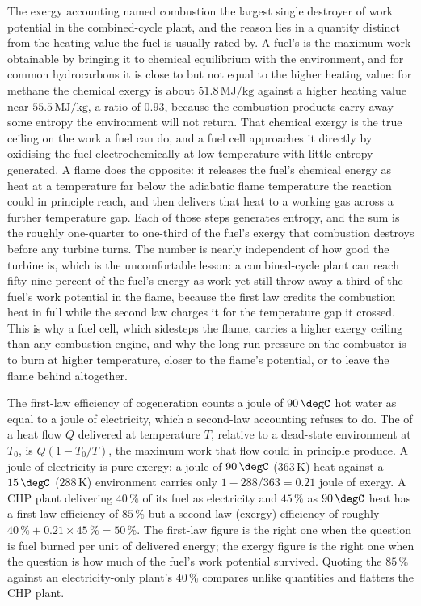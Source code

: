 \begin{mastery}
The exergy accounting named combustion the largest single destroyer of work
potential in the combined-cycle plant, and the reason lies in a quantity distinct
from the heating value the fuel is usually rated by. A fuel's  is the maximum work obtainable by bringing it to chemical equilibrium with
the environment, and for common hydrocarbons it is close to but not equal to the
higher heating value: for methane the chemical exergy is about
$51.8\,\text{MJ}/\text{kg}$ against a higher heating value near
$55.5\,\text{MJ}/\text{kg}$, a ratio of $0.93$, because the combustion products
carry away some entropy the environment will not return. That chemical exergy is
the true ceiling on the work a fuel can do, and a fuel cell approaches it directly
by oxidising the fuel electrochemically at low temperature with little entropy
generated. A flame does the opposite: it releases the fuel's chemical energy as
heat at a temperature far below the adiabatic flame temperature the reaction could
in principle reach, and then delivers that heat to a working gas across a further
temperature gap. Each of those steps generates entropy, and the sum is the roughly
one-quarter to one-third of the fuel's exergy that combustion destroys before any
turbine turns. The number is nearly independent of how good the turbine is, which is
the uncomfortable lesson: a combined-cycle plant can reach fifty-nine percent of the
fuel's energy as work yet still throw away a third of the fuel's work potential in
the flame, because the first law credits the combustion heat in full while the
second law charges it for the temperature gap it crossed. This is why a fuel cell,
which sidesteps the flame, carries a higher exergy ceiling than any combustion
engine, and why the long-run pressure on the combustor is to burn at higher
temperature, closer to the flame's potential, or to leave the flame behind
altogether.
\end{mastery}

\begin{mastery}
The first-law efficiency of cogeneration counts a joule of $90\,\degC$
hot water as equal to a joule of electricity, which a second-law
accounting refuses to do. The  of a heat flow $Q$
delivered at temperature $T$, relative to a dead-state environment at
$T_0$, is $Q(1 - T_0/T)$, the maximum work that flow could in principle
produce. A joule of electricity is pure exergy; a joule of $90\,\degC$
($363\,\si{\kelvin}$) heat against a $15\,\degC$ ($288\,\si{\kelvin}$)
environment carries only $1 - 288/363 = 0.21$ joule of exergy. A CHP
plant delivering $40\,\%$ of its fuel as electricity and $45\,\%$ as
$90\,\degC$ heat has a first-law efficiency of $85\,\%$ but a
second-law (exergy) efficiency of roughly $40\,\% + 0.21 \times 45\,\% =
50\,\%$. The first-law figure is the right one when the question is fuel
burned per unit of delivered energy; the exergy figure is the right one
when the question is how much of the fuel's work potential survived.
Quoting the $85\,\%$ against an electricity-only plant's $40\,\%$
compares unlike quantities and flatters the CHP plant.
\end{mastery}

